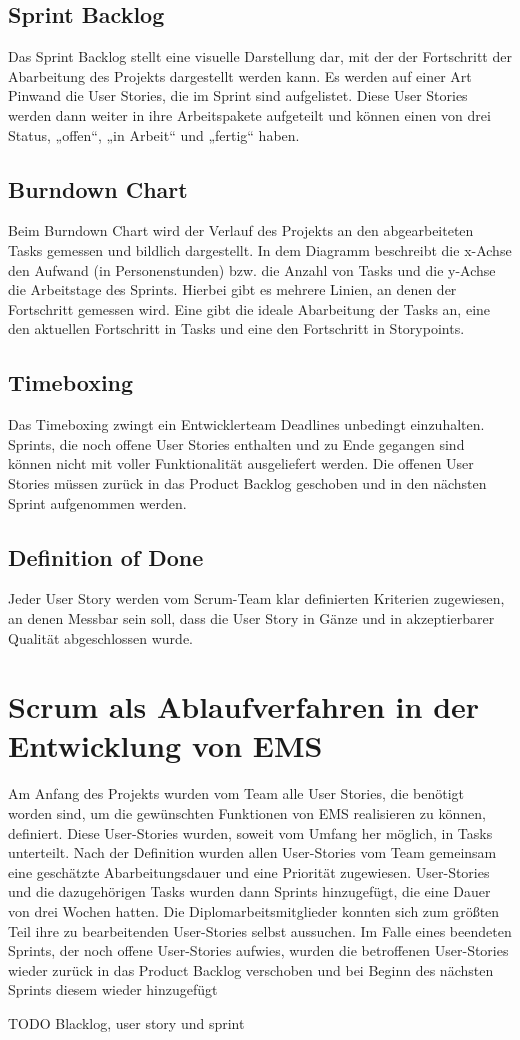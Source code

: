 		\subsection{Sprint Backlog}
		Das Sprint Backlog stellt eine visuelle Darstellung dar, mit der der Fortschritt der Abarbeitung des Projekts dargestellt werden kann. Es werden auf einer Art Pinwand die User Stories, die im Sprint sind aufgelistet. Diese User Stories werden dann weiter in ihre Arbeitspakete aufgeteilt und können einen von drei Status, „offen“, „in Arbeit“ und „fertig“ haben.
		\subsection{Burndown Chart}
		Beim Burndown Chart wird der Verlauf des Projekts an den abgearbeiteten Tasks gemessen und bildlich dargestellt. In dem Diagramm beschreibt die x-Achse den Aufwand (in Personenstunden) bzw. die Anzahl von Tasks und die y-Achse die Arbeitstage des Sprints. 
Hierbei gibt es mehrere Linien, an denen der Fortschritt gemessen wird. Eine gibt die ideale Abarbeitung der Tasks an, eine den aktuellen Fortschritt in Tasks und eine den Fortschritt in Storypoints.

		\subsection{Timeboxing}
		Das Timeboxing zwingt ein Entwicklerteam Deadlines unbedingt einzuhalten. Sprints, die noch offene User Stories enthalten und zu Ende gegangen sind können nicht mit voller Funktionalität ausgeliefert werden. Die offenen User Stories müssen zurück in das Product Backlog geschoben und in den nächsten Sprint aufgenommen werden.
		\subsection{Definition of Done}
  Jeder User Story werden vom Scrum-Team klar definierten Kriterien zugewiesen, an denen Messbar sein soll, dass die User Story in Gänze und in akzeptierbarer Qualität abgeschlossen wurde.
	\section{Scrum als Ablaufverfahren in der Entwicklung von EMS}
	
		Am Anfang des Projekts wurden vom Team alle User Stories, die benötigt worden sind, um die gewünschten Funktionen von EMS realisieren zu können, definiert. Diese User-Stories wurden, soweit vom Umfang her möglich, in Tasks unterteilt. 
Nach der Definition wurden allen User-Stories vom Team gemeinsam eine geschätzte Abarbeitungsdauer und eine Priorität zugewiesen.  
User-Stories und die dazugehörigen Tasks wurden dann Sprints hinzugefügt, die eine Dauer von drei Wochen hatten. Die Diplomarbeitsmitglieder konnten sich zum größten Teil ihre zu bearbeitenden User-Stories selbst aussuchen. Im Falle eines beendeten Sprints, der noch offene User-Stories aufwies, wurden die betroffenen User-Stories wieder zurück in das Product Backlog verschoben und bei Beginn des nächsten Sprints diesem wieder hinzugefügt

TODO Blacklog, user story und sprint
	